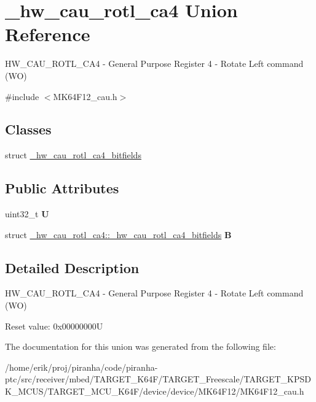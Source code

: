 \hypertarget{union__hw__cau__rotl__ca4}{}\section{\+\_\+hw\+\_\+cau\+\_\+rotl\+\_\+ca4 Union Reference}
\label{union__hw__cau__rotl__ca4}


H\+W\+\_\+\+C\+A\+U\+\_\+\+R\+O\+T\+L\+\_\+\+C\+A4 -\/ General Purpose Register 4 -\/ Rotate Left command (WO)  




{\ttfamily \#include $<$M\+K64\+F12\+\_\+cau.\+h$>$}

\subsection*{Classes}
\begin{DoxyCompactItemize}
\item 
struct \hyperlink{struct__hw__cau__rotl__ca4_1_1__hw__cau__rotl__ca4__bitfields}{\+\_\+hw\+\_\+cau\+\_\+rotl\+\_\+ca4\+\_\+bitfields}
\end{DoxyCompactItemize}
\subsection*{Public Attributes}
\begin{DoxyCompactItemize}
\item 
uint32\+\_\+t {\bfseries U}\hypertarget{union__hw__cau__rotl__ca4_a7742985dd0b10b9bc291279571ac5158}{}\label{union__hw__cau__rotl__ca4_a7742985dd0b10b9bc291279571ac5158}

\item 
struct \hyperlink{struct__hw__cau__rotl__ca4_1_1__hw__cau__rotl__ca4__bitfields}{\+\_\+hw\+\_\+cau\+\_\+rotl\+\_\+ca4\+::\+\_\+hw\+\_\+cau\+\_\+rotl\+\_\+ca4\+\_\+bitfields} {\bfseries B}\hypertarget{union__hw__cau__rotl__ca4_a109c1cfe5e5490829ad60558d18eb31b}{}\label{union__hw__cau__rotl__ca4_a109c1cfe5e5490829ad60558d18eb31b}

\end{DoxyCompactItemize}


\subsection{Detailed Description}
H\+W\+\_\+\+C\+A\+U\+\_\+\+R\+O\+T\+L\+\_\+\+C\+A4 -\/ General Purpose Register 4 -\/ Rotate Left command (WO) 

Reset value\+: 0x00000000U 

The documentation for this union was generated from the following file\+:\begin{DoxyCompactItemize}
\item 
/home/erik/proj/piranha/code/piranha-\/ptc/src/receiver/mbed/\+T\+A\+R\+G\+E\+T\+\_\+\+K64\+F/\+T\+A\+R\+G\+E\+T\+\_\+\+Freescale/\+T\+A\+R\+G\+E\+T\+\_\+\+K\+P\+S\+D\+K\+\_\+\+M\+C\+U\+S/\+T\+A\+R\+G\+E\+T\+\_\+\+M\+C\+U\+\_\+\+K64\+F/device/device/\+M\+K64\+F12/M\+K64\+F12\+\_\+cau.\+h\end{DoxyCompactItemize}
